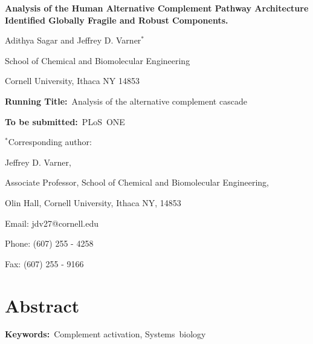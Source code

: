 \documentclass[12pt]{article}
\begin{document}
\begin{titlepage}
{\par\centering\textbf{\large Analysis of the Human Alternative Complement Pathway Architecture Identified Globally Fragile and Robust Components.}}
\vspace{0.05in}
{\par \centering Adithya Sagar and Jeffrey D. Varner$^{*}$}
\vspace{0.05in}
{\par \centering School of Chemical and Biomolecular Engineering}
{\par \centering Cornell University, Ithaca NY 14853}
\vspace{0.1in}
{\par \centering \textbf{Running Title:}~Analysis of the alternative complement cascade}
\vspace{0.1in}
{\par \centering \textbf{To be submitted:}~PLoS~ONE}
\vspace{0.5in}
{\par \centering $^{*}$Corresponding author:}
{\par \centering Jeffrey D. Varner,}
{\par \centering Associate Professor, School of Chemical and Biomolecular Engineering,}
{\par {} Olin Hall, Cornell University, Ithaca NY, 14853} 
{\par \centering Email: jdv27@cornell.edu} 
{\par \centering Phone: (607) 255 - 4258}
{\par \centering Fax: (607) 255 - 9166}
\end{titlepage}
\date{}
\thispagestyle{empty}
\pagebreak
\section*{Abstract}



{\noindent \textbf{Keywords:}~Complement activation, Systems~biology}

\pagebreak

\setcounter{page}{1}
\end{document}
